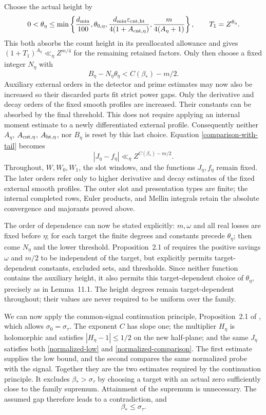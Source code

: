 \documentclass[10pt,reqno,a4paper]{amsart}
\theoremstyle{remark}
\newcommand{\eps}{\varepsilon}
\newcommand{\st}{\sigma_\tau}
\newcommand{\bp}{\beta_*}
\begin{document}
Choose the actual height by
\[
 0<\theta_\eta\le\min\left\{
 \frac{d_{\min}}{100},\theta_{0,\eta},
 \frac{d_{\min}\eps_{{\rm cnt},{\rm ht}}}
      {4(1+A_{{\rm cnt},\eta})},
 \frac{m}{4(A_\eta+1)}\right\},
 \qquad T_1=Z^{\theta_\eta}.
\]
This both absorbs the count height in its preallocated allowance
and gives $(1+T_1)^{A_\eta}\ll_\eta Z^{m/4}$ for the remaining
retained factors. Only then choose a fixed integer $N_\eta$ with
\[
                   B_\eta-N_\eta\theta_\eta<C(\bp)-m/2.
\]
Auxiliary external orders in the detector and prime estimates may
now also be increased so their discarded parts fit strict power
gaps. Only the derivative and decay orders of the fixed smooth profiles
are increased. Their constants can be absorbed by the final threshold.
This does not require applying an internal moment estimate to a newly
differentiated external profile. Consequently neither $A_\eta$, $A_{{\rm cnt},\eta}$,
$A_{{\rm ht},\eta}$, nor $B_\eta$ is reset by this last choice.
Equation \eqref{comparison-with-tail} becomes
\begin{equation}\label{normalized-comparison}
               |J_\eta-f_\eta|\ll_\eta Z^{C(\bp)-m/2}.
\end{equation}
Throughout, $W,W_0,W_1$, the slot windows, and the functions
$J_\eta,f_\eta$ remain fixed. The later orders refer only to higher
derivative and decay estimates of the fixed external smooth profiles.
The outer slot and presentation types are finite; the internal
completed rows, Euler products, and Mellin integrals retain the
absolute convergence and majorants proved above.

The order of dependence can now be stated explicitly:
$m,\omega$ and all real losses are fixed before $\eta$; for each
target the finite degrees and constants precede $\theta_\eta$;
then come $N_\eta$ and the lower threshold. Proposition~2.1 of
\cite{q30} requires the positive savings $\omega$ and $m/2$ to be
independent of the target, but explicitly permits target-dependent
constants, excluded sets, and thresholds. Since neither function
contains the auxiliary height, it also permits this target-dependent
choice of $\theta_\eta$, precisely as in Lemma~11.1. The height degrees remain target-dependent throughout; their values
are never required to be uniform over the family.

We can now apply the common-signal continuation principle,
Proposition~2.1 of \cite{q30}, which allows $\sigma_0=\st$.
The exponent $C$ has slope one; the multiplier $H_\eta$ is
holomorphic and satisfies $|H_\eta-1|\le1/2$ on the new
half-plane; and the same $J_\eta$ satisfies both
\eqref{normalized-low} and \eqref{normalized-comparison}.
The first estimate supplies the low bound, and the second compares
the same normalized probe with the signal. Together they are the two
estimates required by the continuation principle. It excludes $\bp>\st$ by choosing a target
with an actual zero sufficiently close to the family supremum.
Attainment of the supremum is unnecessary. The assumed gap
therefore leads to a contradiction, and
\[
                                      \bp\le\st.
\]
\end{document}
